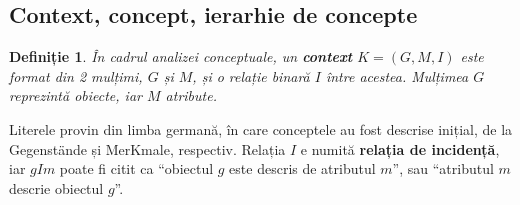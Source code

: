 \documentclass[12pt, a4paper, twoside, romanian]{teza-upb}
\newtheorem{defn}{Definiție}
\begin{document}
    \subsection{Context, concept, ierarhie de concepte}
    \begin{defn}
      În cadrul analizei conceptuale, un \textbf{context} $K = (G, M, I)$ este format din 2 mulțimi, $G$ și $M$, și o relație binară $I$ între acestea. Mulțimea $G$ reprezintă obiecte, iar $M$ atribute.
    \end{defn}

      Literele provin din limba germană, în care conceptele au fost descrise inițial, de la Gegenstände și MerKmale, respectiv. Relația $I$ e numită \textbf{relația de incidență}, iar $gIm$ poate fi citit ca ``obiectul $g$ este descris de atributul $m$'', sau ``atributul $m$ descrie obiectul $g$''.
\end{document}
